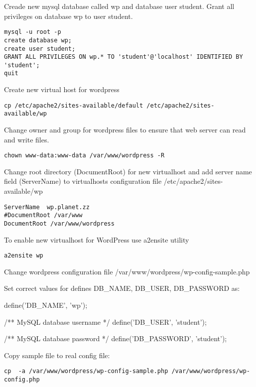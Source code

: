 Creade new mysql database called wp and database user student. Grant all privileges on database wp to user student.

\begin{verbatim}
mysql -u root -p
create database wp;
create user student;
GRANT ALL PRIVILEGES ON wp.* TO 'student'@'localhost' IDENTIFIED BY 'student';
quit
\end{verbatim}

Create new virtual host for wordpress 
\begin{verbatim}
cp /etc/apache2/sites-available/default /etc/apache2/sites-available/wp
\end{verbatim}

Change owner and group for wordpress files to ensure that web server can read and write files.
\begin{verbatim}
chown www-data:www-data /var/www/wordpress -R
\end{verbatim}

Change root directory (DocumentRoot) for new virtualhost and add server name field (ServerName) to virtualhosts configuration file   /etc/apache2/sites-available/wp


\begin{verbatim}
ServerName	wp.planet.zz
#DocumentRoot /var/www
DocumentRoot /var/www/wordpress
\end{verbatim}


To enable new virtualhost for WordPress use a2ensite utility
\begin{verbatim}
a2ensite wp
\end{verbatim}

Change wordpress configuration file
/var/www/wordpress/wp-config-sample.php

Set correct values for defines DB\_NAME, DB\_USER, DB\_PASSWORD as:

define('DB\_NAME', 'wp');

/** MySQL database username */
define('DB\_USER', 'student');

/** MySQL database password */
define('DB\_PASSWORD', 'student');


Copy sample file to real config file:
\begin{verbatim}
cp  -a /var/www/wordpress/wp-config-sample.php /var/www/wordpress/wp-config.php
\end{verbatim}

